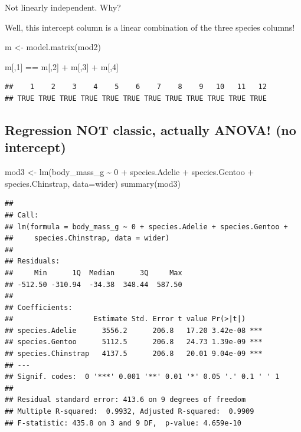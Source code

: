 \documentclass[
  openany]{book}
\newenvironment{Shaded}{\begin{snugshade}}{\end{snugshade}}
\newcommand{\AttributeTok}[1]{\textcolor[rgb]{0.77,0.63,0.00}{#1}}
\newcommand{\DecValTok}[1]{\textcolor[rgb]{0.00,0.00,0.81}{#1}}
\newcommand{\FunctionTok}[1]{\textcolor[rgb]{0.00,0.00,0.00}{#1}}
\newcommand{\NormalTok}[1]{#1}
\newcommand{\OtherTok}[1]{\textcolor[rgb]{0.56,0.35,0.01}{#1}}
\newcommand{\SpecialCharTok}[1]{\textcolor[rgb]{0.00,0.00,0.00}{#1}}
\begin{document}
Not linearly independent. Why?

Well, this intercept column is a linear combination of the three species columns!

\begin{Shaded}
\begin{Highlighting}[]
\NormalTok{m }\OtherTok{\textless{}{-}} \FunctionTok{model.matrix}\NormalTok{(mod2)}

\NormalTok{m[,}\DecValTok{1}\NormalTok{] }\SpecialCharTok{==}\NormalTok{ m[,}\DecValTok{2}\NormalTok{] }\SpecialCharTok{+}\NormalTok{ m[,}\DecValTok{3}\NormalTok{] }\SpecialCharTok{+}\NormalTok{ m[,}\DecValTok{4}\NormalTok{]}
\end{Highlighting}
\end{Shaded}

\begin{verbatim}
##    1    2    3    4    5    6    7    8    9   10   11   12 
## TRUE TRUE TRUE TRUE TRUE TRUE TRUE TRUE TRUE TRUE TRUE TRUE
\end{verbatim}

\hypertarget{regression-not-classic-actually-anova-no-intercept}{%
\subsection{Regression NOT classic, actually ANOVA! (no intercept)}\label{regression-not-classic-actually-anova-no-intercept}}

\begin{Shaded}
\begin{Highlighting}[]
\NormalTok{mod3 }\OtherTok{\textless{}{-}} \FunctionTok{lm}\NormalTok{(body\_mass\_g }\SpecialCharTok{\textasciitilde{}} \DecValTok{0} \SpecialCharTok{+}\NormalTok{ species.Adelie }\SpecialCharTok{+}\NormalTok{ species.Gentoo }\SpecialCharTok{+}\NormalTok{ species.Chinstrap, }\AttributeTok{data=}\NormalTok{wider)}
\FunctionTok{summary}\NormalTok{(mod3)}
\end{Highlighting}
\end{Shaded}

\begin{verbatim}
## 
## Call:
## lm(formula = body_mass_g ~ 0 + species.Adelie + species.Gentoo + 
##     species.Chinstrap, data = wider)
## 
## Residuals:
##     Min      1Q  Median      3Q     Max 
## -512.50 -310.94  -34.38  348.44  587.50 
## 
## Coefficients:
##                   Estimate Std. Error t value Pr(>|t|)    
## species.Adelie      3556.2      206.8   17.20 3.42e-08 ***
## species.Gentoo      5112.5      206.8   24.73 1.39e-09 ***
## species.Chinstrap   4137.5      206.8   20.01 9.04e-09 ***
## ---
## Signif. codes:  0 '***' 0.001 '**' 0.01 '*' 0.05 '.' 0.1 ' ' 1
## 
## Residual standard error: 413.6 on 9 degrees of freedom
## Multiple R-squared:  0.9932, Adjusted R-squared:  0.9909 
## F-statistic: 435.8 on 3 and 9 DF,  p-value: 4.659e-10
\end{verbatim}
\end{document}
